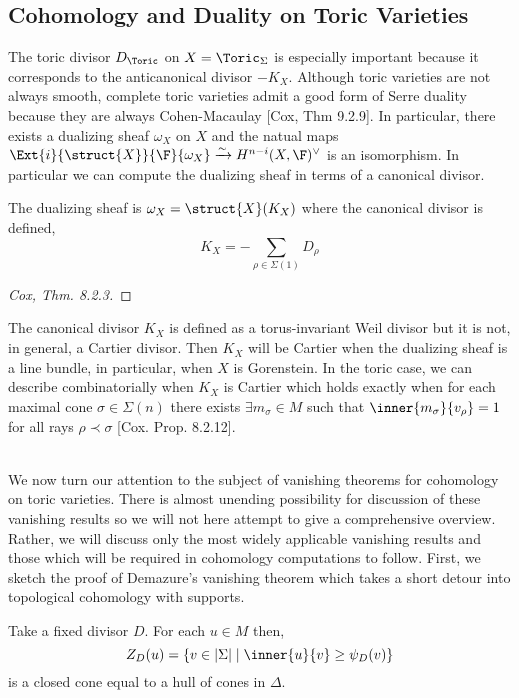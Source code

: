\subsection{Cohomology and Duality on Toric Varieties} 

The toric divisor $D_\Toric$ on $X = \Toric_\Sigma$ is especially important because it corresponds to the anticanonical divisor $-K_X$. Although toric varieties are not always smooth, complete toric varieties admit a good form of Serre duality because they are always Cohen-Macaulay [Cox, Thm 9.2.9]. In particular, there exists a dualizing sheaf $\omega_X$ on $X$ and the natual maps $\Ext{i}{\struct{X}}{\F}{\omega_X} \xrightarrow{\sim} H^{n-i}(X, \F)^\vee$ is an isomorphism. In particular we can compute the dualizing sheaf in terms of a canonical divisor.
\begin{lemma}
The dualizing sheaf is $\omega_X = \struct{X}(K_X)$ where the canonical divisor is defined,
\[ K_X =  - \sum_{\rho \in \Sigma(1)} D_\rho \]
\end{lemma}

\begin{proof}
[Cox, Thm. 8.2.3]
\end{proof}

\begin{rmk}
The canonical divisor $K_X$ is defined as a torus-invariant Weil divisor but it is not, in general, a Cartier divisor. Then $K_X$ will be Cartier when the dualizing sheaf is a line bundle, in particular, when $X$ is Gorenstein. In the toric case, we can describe combinatorially when $K_X$ is Cartier which holds exactly when for each maximal cone $\sigma \in \Sigma(n)$ there exists $\exists m_\sigma \in M$ such that $\inner{m_\sigma}{v_\rho} = 1$ for all rays $\rho \prec \sigma$ [Cox. Prop. 8.2.12]. 
\end{rmk}
\noindent\\
We now turn our attention to the subject of vanishing theorems for cohomology on toric varieties. There is almost unending possibility for discussion of these vanishing results so we will not here attempt to give a comprehensive overview. Rather, we will discuss only the most widely applicable vanishing results and those which will be required in cohomology computations to follow. First, we sketch the proof of Demazure's vanishing theorem which takes a short detour into topological cohomology with supports.


\begin{definition}
Take a fixed divisor $D$. For each $u \in M$ then,
\[ Z_D(u) = \{ v \in |\Sigma| \mid \inner{u}{v} \ge \psi_D(v) \} \]
is a closed cone equal to a hull of cones in $\Delta$. 
\end{definition}

